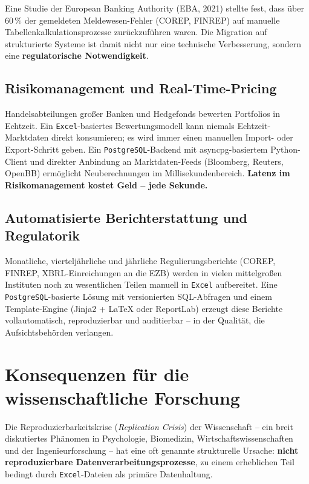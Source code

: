 \documentclass[12pt,a4paper]{report}
\theoremstyle{definition}
\theoremstyle{remark}
\newcommand{\excel}{\texttt{Excel}}
\newcommand{\pg}{\texttt{PostgreSQL}}
\begin{document}
Eine Studie der European Banking Authority (EBA, 2021)
stellte fest, dass über 60\,\% der gemeldeten Meldewesen-Fehler
(COREP, FINREP) auf manuelle Tabellenkalkulationsprozesse
zurückzuführen waren. Die Migration auf strukturierte Systeme
ist damit nicht nur eine technische Verbesserung, sondern eine
\textbf{regulatorische Notwendigkeit}.

\subsection{Risikomanagement und Real-Time-Pricing}

Handelsabteilungen großer Banken und Hedgefonds bewerten Portfolios
in Echtzeit. Ein \excel-basiertes Bewertungsmodell kann niemals
Echtzeit-Marktdaten direkt konsumieren; es wird immer einen manuellen
Import- oder Export-Schritt geben.
Ein \pg-Backend mit asyncpg-basiertem Python-Client und direkter
Anbindung an Marktdaten-Feeds (Bloomberg, Reuters, OpenBB) ermöglicht
Neuberechnungen im Millisekundenbereich.
\textbf{Latenz im Risikomanagement kostet Geld -- jede Sekunde.}

\subsection{Automatisierte Berichterstattung und Regulatorik}

Monatliche, vierteljährliche und jährliche Regulierungsberichte
(COREP, FINREP, XBRL-Einreichungen an die EZB) werden in vielen
mittelgroßen Instituten noch zu wesentlichen Teilen manuell in
\excel{} aufbereitet.
Eine \pg-basierte Lösung mit versionierten SQL-Abfragen und einem
Template-Engine (Jinja2 + \LaTeX{} oder ReportLab) erzeugt diese
Berichte vollautomatisch, reproduzierbar und auditierbar -- in der
Qualität, die Aufsichtsbehörden verlangen.

\section{Konsequenzen für die wissenschaftliche Forschung}

Die Reproduzierbarkeitskrise (\textit{Replication Crisis}) der
Wissenschaft -- ein breit diskutiertes Phänomen in Psychologie,
Biomedizin, Wirtschaftswissenschaften und der Ingenieurforschung --
hat eine oft genannte strukturelle Ursache: \textbf{nicht
reproduzierbare Datenverarbeitungsprozesse}, zu einem erheblichen
Teil bedingt durch \excel-Dateien als primäre Datenhaltung.
\end{document}
